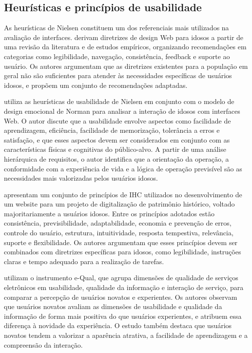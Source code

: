 \subsection{Heurísticas e princípios de usabilidade}

\label{sec:heuristicas}

As heurísticas de Nielsen constituem um dos referenciais mais utilizados na avaliação de interfaces. \cite{kurniawan2005research} derivam diretrizes de design Web para idosos a partir de uma revisão da literatura e de estudos empíricos, organizando recomendações em categorias como legibilidade, navegação, consistência, feedback e suporte ao usuário. Os autores argumentam que as diretrizes existentes para a população em geral não são suficientes para atender às necessidades específicas de usuários idosos, e propõem um conjunto de recomendações adaptadas.

\cite{wang2020research} utiliza as heurísticas de usabilidade de Nielsen em conjunto com o modelo de design emocional de Norman para analisar a interação de idosos com interfaces Web. O autor discute que a usabilidade envolve aspectos como facilidade de aprendizagem, eficiência, facilidade de memorização, tolerância a erros e satisfação, e que esses aspectos devem ser considerados em conjunto com as características físicas e cognitivas do público-alvo. A partir de uma análise hierárquica de requisitos, o autor identifica que a orientação da operação, a conformidade com a experiência de vida e a lógica de operação previsível são as necessidades mais valorizadas pelos usuários idosos.

\cite{shi2016supporting} apresentam um conjunto de princípios de IHC utilizados no desenvolvimento de um website para um projeto de digitalização de patrimônio histórico, voltado majoritariamente a usuários idosos. Entre os princípios adotados estão consistência, previsibilidade, adaptabilidade, economia e prevenção de erros, controle do usuário, estrutura, intuitividade, resposta tempestiva, relevância, suporte e flexibilidade. Os autores argumentam que esses princípios devem ser combinados com diretrizes específicas para idosos, como legibilidade, instruções claras e tempo adequado para a realização de tarefas.

\cite{nosseir2011novice} utilizam o instrumento e-Qual, que agrupa dimensões de qualidade de serviços eletrônicos em usabilidade, qualidade da informação e interação de serviço, para comparar a percepção de usuários novatos e experientes. Os autores observam que usuários novatos avaliam as dimensões de usabilidade e qualidade da informação de forma mais positiva do que usuários experientes, e atribuem essa diferença à novidade da experiência. O estudo também destaca que usuários novatos tendem a valorizar a aparência atrativa, a facilidade de aprendizagem e a compreensão da interação.

